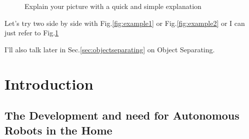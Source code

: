 \documentclass[12pt]{utscapstone}
\begin{document}
\begin{figure}[ht]
\caption[This will appear in the table of contents]{Explain your picture with a quick and simple explanation}
\label{fig:middle}
\end{figure}


Let's try two side by side with Fig.\ref{fig:example1} or Fig.\ref{fig:example2} or I can just refer to Fig.\ref{fig:middle}

I'll also talk later in Sec.\ref{sec:objectseparating} on Object Separating.


\chapter{Introduction}
\label{intro}
\section{The Development and need for Autonomous Robots in the Home}
\label{needforrobotsathome}
\end{document}
